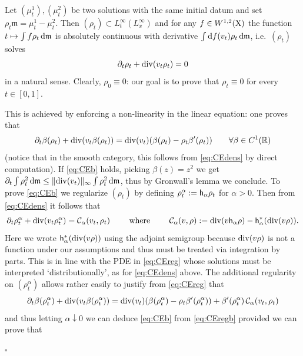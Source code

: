 \documentclass[11pt]{article}
\numberwithin{equation}{section}
\newenvironment{idea}{\removelastskip\par\medskip   %
\noindent{\em Idea of the proof} \rm}{\penalty-20\null\hfill$\square$\par\medbreak}
\newcommand{\R}{\mathbb{R}}
\newcommand{\X}{{\rm X}}
\newcommand{\mm}{{\mathfrak m}}
\renewcommand{\d}{{\rm d}}
\renewcommand{\div}{{\rm div}}
\newcommand{\Lip}{{\rm Lip}}
\newcommand{\h}{{\sf h}} %
\begin{document}
\begin{idea}
 Let $(\mu^1_t),(\mu^2_t)$ be two solutions with the same initial datum and set $\rho_t\mm=\mu^1_t-\mu^2_t$. Then  $(\rho_t)\subset L^\infty_t(L^\infty_x)$ and for any $f\in W^{1,2}(\X)$ the function $t\mapsto \int f\rho_t\,\d\mm$ is absolutely continuous with derivative $\int \d f(v_t)\rho_t\,\d\mm$, i.e.\ $(\rho_t)$ solves
\begin{equation}
\label{eq:CEdens}
\partial_t\rho_t+\div(v_t\rho_t)=0
\end{equation}
in a natural sense. Clearly, $\rho_0\equiv 0$: our goal is to prove that $\rho_t\equiv 0$ for every $t\in[0,1]$.

This is achieved by enforcing a non-linearity in the linear equation: one proves that %
\begin{equation}
\label{eq:CEb}
\partial_t\beta(\rho_t)+\div(v_t\beta(\rho_t))=\div(v_t)(\beta(\rho_t)-\rho_t\beta'(\rho_t))\qquad\forall \beta\in C^1(\R)
\end{equation}
(notice that in the smooth category, this follows from \eqref{eq:CEdens} by direct computation). If \eqref{eq:CEb} holds, picking $\beta(z)=z^2$   we get $\partial_t\int\rho_t^2\,\d\mm\leq {\|\div(v_t)\|_\infty}\int\rho_t^2\,\d\mm$, thus by Gronwall's lemma we conclude. To prove \eqref{eq:CEb} we regularize $(\rho_t)$ by defining $\rho^\alpha_t:=\h_\alpha\rho_t$ for $\alpha>0$. Then from   \eqref{eq:CEdens} it follows that  
\begin{equation}
\label{eq:CEreg}
\partial_t\rho^\alpha_t+\div(v_t\rho^\alpha_t)=\mathcal C_\alpha(v_t,\rho_t)\qquad\text{ where }\qquad \mathcal C_\alpha(v,\rho):=\div(v\h_\alpha\rho)-\h_\alpha^*(\div(v\rho)).
\end{equation}
Here we wrote $\h_\alpha^*(\div(v\rho))$ using the adjoint semigroup because $\div(v\rho)$ is not a function under our assumptions and thus must be treated via integration by parts. This is in line with the PDE in \eqref{eq:CEreg} whose solutions must be interpreted `distributionally', as for \eqref{eq:CEdens} above. The additional regularity on $(\rho^\alpha_t)$ allows rather easily to justify from \eqref{eq:CEreg} that
\begin{equation}
\label{eq:CEregb}
\partial_t\beta(\rho^\alpha_t)+\div(v_t\beta(\rho^\alpha_t))=\div(v_t)(\beta(\rho^\alpha_t)-\rho_t\beta'(\rho^\alpha_t))+\beta'(\rho^\alpha_t)\,\mathcal C_\alpha(v_t,\rho_t)
\end{equation}
and thus letting $\alpha\downarrow0$ we can deduce \eqref{eq:CEb} from \eqref{eq:CEregb} provided we can prove that

\end{idea}
\end{document}
